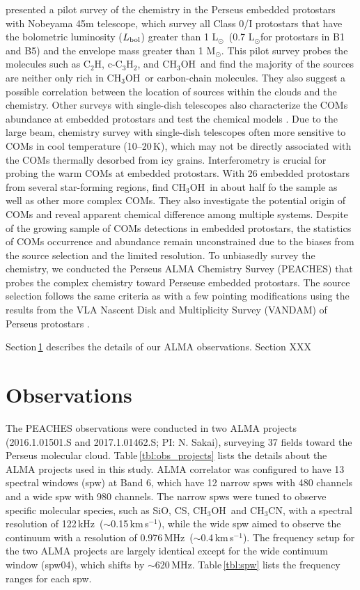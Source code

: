 \documentclass[twocolumn]{aastex62}
\newcommand{\lsun}{\mbox{\,L$_\odot$}}
\newcommand{\msun}{\mbox{\,M$_\odot$}}
\newcommand{\kms}{\mbox{\,km\,s$^{-1}$}}
\newcommand{\mhz}{\mbox{\,MHz}}
\newcommand{\khz}{\mbox{\,kHz}}
\newcommand{\lbol}{\mbox{$L_{\rm bol}$}}
\newcommand{\methanol}{\mbox{CH$_{3}$OH}}
\newcommand{\methylcyanide}{\mbox{CH$_{3}$CN}}
\begin{document}
\citet{2018ApJS..236...52H} presented a pilot survey of the chemistry in the Perseus embedded protostars with Nobeyama 45m telescope, which survey all Class 0/I protostars \citep{2007A&A...468.1009H} that have the bolometric luminosity (\lbol) greater than 1\,\lsun\ (0.7\,\lsun for protostars in B1 and B5) and the envelope mass greater than 1\,\msun.  This pilot survey probes the molecules such as C$_2$H, c-C$_3$H$_2$, and \methanol\ and find the majority of the sources are neither only rich in \methanol\ or carbon-chain molecules.  They also suggest a possible correlation between the location of sources within the clouds and the chemistry.  Other surveys with single-dish telescopes also characterize the COMs abundance at embedded protostars and test the chemical models \citep[e.g., ][]{2017ApJ...841..120B}.  Due to the large beam, chemistry survey with single-dish telescopes often more sensitive to COMs in cool temperature (10--20\,K), which may not be directly associated with the COMs thermally desorbed from icy grains.  Interferometry is crucial for probing the warm COMs at embedded protostars.  With 26 embedded protostars from several star-forming regions, \citet{2020A&A...635A.198B} find \methanol\ in about half fo the sample as well as other more complex COMs.  They also investigate the potential origin of COMs and reveal apparent chemical difference among multiple systems.  Despite of the growing sample of COMs detections in embedded protostars, the statistics of COMs occurrence and abundance remain unconstrained due to the biases from the source selection and the limited resolution.  To unbiasedly survey the chemistry, we conducted the Perseus ALMA Chemistry Survey (PEACHES) that probes the complex chemistry toward Perseuse embedded protostars.  The source selection follows the same criteria as \citet{2018ApJS..236...52H} with a few pointing modifications using the results from the VLA Nascent Disk and Multiplicity Survey (VANDAM) of Perseus protostars \citep{2016ApJ...818...73T}.

Section\,\ref{sec:observations} describes the details of our ALMA observations.  Section XXX

\section{Observations}
\label{sec:observations}
The PEACHES observations were conducted in two ALMA projects (2016.1.01501.S and 2017.1.01462.S; PI: N. Sakai), surveying 37 fields toward the Perseus molecular cloud.  Table\,\ref{tbl:obs_projects} lists the details about the ALMA projects used in this study.  ALMA correlator was configured to have 13 spectral windows (spw) at Band 6, which have 12 narrow spws with 480 channels and a wide spw with 980 channels.  The narrow spws were tuned to observe specific molecular species, such as SiO, CS, \methanol\ and \methylcyanide, with a spectral resolution of 122\khz\ ($\sim$0.15\kms), while the wide spw aimed to observe the continuum with a resolution of 0.976\mhz\ ($\sim$0.4\kms).  The frequency setup for the two ALMA projects are largely identical except for the wide continuum window (spw04), which shifts by $\sim$620\mhz.  Table\,\ref{tbl:spw} lists the frequency ranges for each spw.
\end{document}
